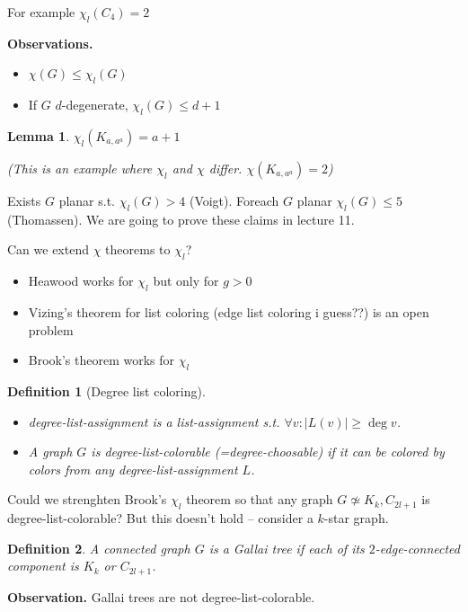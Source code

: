 \documentclass{article}
\newtheorem*{definition}{Definition}
\newtheorem*{lemma}{Lemma}
\begin{document}
\noindent
For example $\chi_l(C_4) = 2$

\noindent
\textbf{Observations.}
\begin{itemize}
	\item $\chi(G) \le \chi_l(G)$
	\item If $G$ $d$-degenerate, $\chi_l(G) \le d + 1$
\end{itemize}

\begin{lemma}
	$\chi_l(K_{a,a^a}) = a + 1$

	(This is an example where $\chi_l$ and $\chi$ differ. $\chi(K_{a,a^a})
	= 2$)
\end{lemma}

\noindent
Exists $G$ planar s.t. $\chi_l(G) > 4$ (Voigt). Foreach $G$ planar $\chi_l(G)
\le 5$ (Thomassen). We are going to prove these claims in lecture 11.

\noindent
Can we extend $\chi$ theorems to $\chi_l$?
\begin{itemize}
	\item Heawood works for $\chi_l$ but only for $g > 0$
	\item Vizing's theorem for list coloring (edge list coloring i guess??)
		is an open problem
	\item Brook's theorem works for $\chi_l$
\end{itemize}

\begin{definition}[Degree list coloring]
	~
	\begin{itemize}
		\item \emph{degree-list-assignment} is a list-assignment s.t.
			$\forall v: |L(v)| \ge \deg v$.

		\item A graph $G$ is \emph{degree-list-colorable}
			(=degree-choosable) if it can be colored by colors from
			any degree-list-assignment $L$.
	\end{itemize}
\end{definition}

\noindent
Could we strenghten Brook's $\chi_l$ theorem so that any graph $G \not \simeq
K_k, C_{2l+1}$ is degree-list-colorable? But this doesn't hold -- consider a
$k$-star graph.

\begin{definition}
	A connected graph $G$ is a \emph{Gallai tree} if each of its
	$2$-edge-connected component is $K_k$ or $C_{2l+1}$.
\end{definition}

\noindent
\textbf{Observation.} Gallai trees are not degree-list-colorable.
\end{document}
